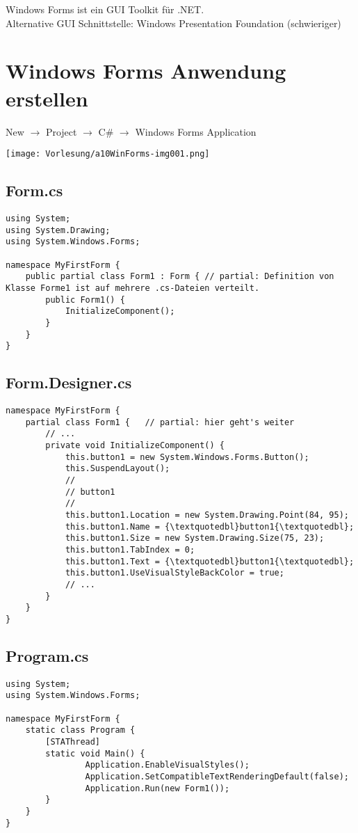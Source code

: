 Windows Forms ist ein GUI Toolkit für .NET.\\
Alternative GUI Schnittstelle: Windows Presentation Foundation (schwieriger)

\section{Windows Forms Anwendung erstellen}

New $\to$ Project $\to$ C\# $\to$ Windows Forms Application
\begin{center}
\texttt{[image: Vorlesung/a10WinForms-img001.png]} 
\end{center}

\subsection{Form.cs}
\begin{lstlisting}[language={[Sharp]C}]
using System;
using System.Drawing;
using System.Windows.Forms;

namespace MyFirstForm {
	public partial class Form1 : Form {	// partial: Definition von Klasse Forme1 ist auf mehrere .cs-Dateien verteilt.
		public Form1() {
			InitializeComponent();
		}
	}
}
\end{lstlisting}

\subsection{Form.Designer.cs}
\begin{lstlisting}[language={[Sharp]C}]
namespace MyFirstForm {
	partial class Form1 {	// partial: hier geht's weiter
		// ...
		private void InitializeComponent() {
			this.button1 = new System.Windows.Forms.Button();
			this.SuspendLayout();
			// 
			// button1
			// 
			this.button1.Location = new System.Drawing.Point(84, 95);
			this.button1.Name = {\textquotedbl}button1{\textquotedbl};
			this.button1.Size = new System.Drawing.Size(75, 23);
			this.button1.TabIndex = 0;
			this.button1.Text = {\textquotedbl}button1{\textquotedbl};
			this.button1.UseVisualStyleBackColor = true;
			// ...
		}
	}
}
\end{lstlisting}

\subsection{Program.cs}
\begin{lstlisting}[language={[Sharp]C}]
using System;
using System.Windows.Forms;

namespace MyFirstForm {
	static class Program {
		[STAThread]
		static void Main() {
				Application.EnableVisualStyles();
				Application.SetCompatibleTextRenderingDefault(false);
				Application.Run(new Form1());
		}
	}
}
\end{lstlisting}

